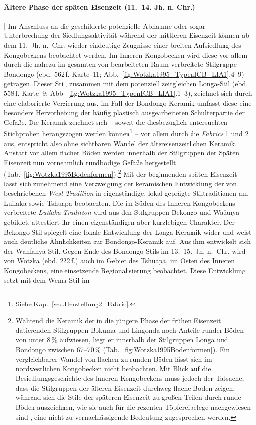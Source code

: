 \paragraph{Ältere Phase der späten Eisenzeit (11.--14. Jh. n. Chr.)}\hspace{-.5em}|\hspace{.5em}%
Im Anschluss an die geschilderte potenzielle Abnahme oder sogar Unterbrechung der Siedlungsaktivität während der mittleren Eisenzeit können ab dem 11.~Jh. n.~Chr. wieder eindeutige Zeugnisse einer breiten Aufsiedlung des Kongobeckens beobachtet werden. Im Inneren Kongobecken wird diese vor allem durch die nahezu im gesamten von \textcite{Wotzka.1995} bearbeiteten Raum verbreitete Stilgruppe Bondongo (ebd. 562\,f. Karte~11; Abb.~\ref{fig:Wotzka1995_TypenICB_LIA1}.4--9) getragen. Dieser Stil, zusammen mit dem potenziell zeitgleichen Longa-Stil (ebd. 558\,f. Karte~9; Abb.~\ref{fig:Wotzka1995_TypenICB_LIA1}.1--3), zeichnet sich durch eine elaborierte Verzierung aus, im Fall der Bondongo-Keramik umfasst diese eine besondere Hervorhebung der häufig plastisch ausgearbeiteten Schulterpartie der Gefäße. Die Keramik zeichnet sich -- soweit die diesbezüglich untersuchten Stichproben herangezogen werden können\footnote{Siehe Kap.~\ref{sec:Herstellung2_Fabric}.} -- vor allem durch die \textit{Fabrics} 1 und 2 aus, entspricht also ohne sichtbaren Wandel der ältereisenzeitlichen Keramik. Anstatt vor allem flacher Böden werden innerhalb der Stilgruppen der Späten Eisenzeit nun vornehmlich rundbodige Gefäße hergestellt (Tab.~\ref{fig:Wotzka1995Bodenformen}).\footnote{Während die Keramik der in die jüngere Phase der frühen Eisenzeit datierenden Stilgruppen Bokuma und Lingonda noch Anteile runder Böden von unter 8\,\% aufwiesen, liegt er innerhalb der Stilgruppen Longa und Bondongo zwischen 67--70\,\% (Tab.~\ref{fig:Wotzka1995Bodenformen}). Ein vergleichbarer Wandel von flachen zu runden Böden lässt sich im nordwestlichen Kongobecken nicht beobachten. Mit Blick auf die Besiedlungsgeschichte des Inneren Kongobeckens muss jedoch der Tatsache, dass die Stilgruppen der älteren Eisenzeit durchweg flache Boden zeigen, während sich die Stile der späteren Eisenzeit zu großen Teilen durch runde Böden auszeichnen, wie sie auch für die rezenten Töpfereibelege nachgewiesen sind \parencite{Eggert.1980c}, eine nicht zu vernachlässigende Bedeutung zugesprochen werden.} Mit der beginnenden späten Eisenzeit lässt sich zunehmend eine Verzweigung der keramischen Entwicklung der von \textcite[221--223]{Wotzka.1995} beschriebenen \textit{West-Tradition} in eigenständige, lokal geprägte Stiltraditionen am Luilaka sowie Tshuapa beobachten. Die im Süden des Inneren Kongobeckens verbreitete \textit{Luilaka-Tradition} wird aus den Stilgruppen Bekongo und Wafanya gebildet. \textcite{Wotzka.1995} attestiert ihr einen eigenständigen aber kurzlebigen Charakter. Der Bekongo-Stil spiegelt eine lokale Entwicklung der Longa-Keramik wider und weist auch deutliche Ähnlichkeiten zur Bondongo-Keramik auf. Aus ihm entwickelt sich der Wanfanya-Stil. Gegen Ende des Bondongo-Stils im 13.--15.~Jh. n.~Chr. wird von Wotzka (ebd. 222\,f.) auch im Gebiet des Tshuapa, im Osten des Inneren Kongobeckens, eine einsetzende Regionalisierung beobachtet. Diese Entwicklung setzt mit dem Wema-Stil im 
